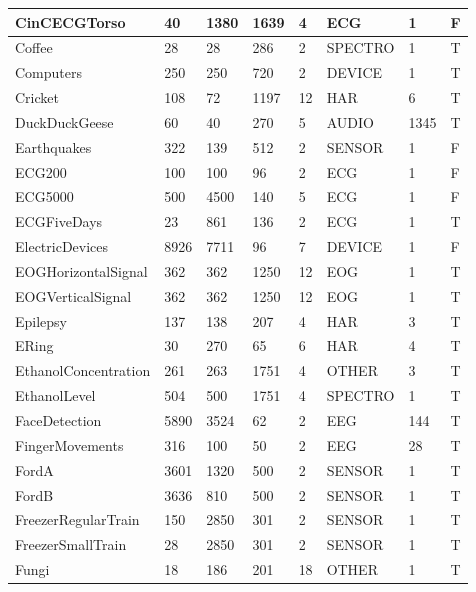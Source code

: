 \begin{landscape}
\begin{longtable}{|*{8}l|}
        \hline
        CinCECGTorso & 40 & 1380 & 1639 & 4 & ECG & 1 & F \\
        \hline
        Coffee & 28 & 28 & 286 & 2 & SPECTRO & 1 & T \\
        \hline
        Computers & 250 & 250 & 720 & 2 & DEVICE & 1 & T \\
        \hline
        Cricket & 108 & 72 & 1197 & 12 & HAR & 6 & T \\
        \hline
        DuckDuckGeese & 60 & 40 & 270 & 5 & AUDIO & 1345 & T \\
        \hline
        Earthquakes & 322 & 139 & 512 & 2 & SENSOR & 1 & F \\
        \hline
        ECG200 & 100 & 100 & 96 & 2 & ECG & 1 & F \\
        \hline
        ECG5000 & 500 & 4500 & 140 & 5 & ECG & 1 & F \\
        \hline
        ECGFiveDays & 23 & 861 & 136 & 2 & ECG & 1 & T \\
        \hline
        ElectricDevices & 8926 & 7711 & 96 & 7 & DEVICE & 1 & F \\
        \hline
        EOGHorizontalSignal & 362 & 362 & 1250 & 12 & EOG & 1 & T \\
        \hline
        EOGVerticalSignal & 362 & 362 & 1250 & 12 & EOG & 1 & T \\
        \hline
        Epilepsy & 137 & 138 & 207 & 4 & HAR & 3 & T \\
        \hline
        ERing & 30 & 270 & 65 & 6 & HAR & 4 & T \\
        \hline
        EthanolConcentration & 261 & 263 & 1751 & 4 & OTHER & 3 & T \\
        \hline
        EthanolLevel & 504 & 500 & 1751 & 4 & SPECTRO & 1 & T \\
        \hline
        FaceDetection & 5890 & 3524 & 62 & 2 & EEG & 144 & T \\
        \hline
        FingerMovements & 316 & 100 & 50 & 2 & EEG & 28 & T \\
        \hline
        FordA & 3601 & 1320 & 500 & 2 & SENSOR & 1 & T \\
        \hline
        FordB & 3636 & 810 & 500 & 2 & SENSOR & 1 & T \\
        \hline
        FreezerRegularTrain & 150 & 2850 & 301 & 2 & SENSOR & 1 & T \\
        \hline
        FreezerSmallTrain & 28 & 2850 & 301 & 2 & SENSOR & 1 & T \\
        \hline
        Fungi & 18 & 186 & 201 & 18 & OTHER & 1 & T \\

\end{longtable}
\end{landscape}
